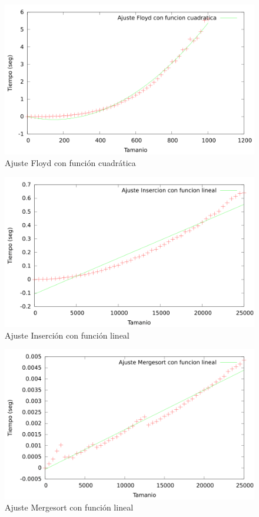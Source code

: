 \documentclass{article}
\begin{document}
	\begin{figure}[h]
		\centering
		\includegraphics[totalheight=8cm]{img/ajusteFloyd_cuadratico}
		\caption{Ajuste Floyd con función cuadrática}
		\label{fig:ajusteFloyd_cuadratico}
	\end{figure}
	
	\begin{figure}[h]
		\centering
		\includegraphics[totalheight=8cm]{img/ajusteInsercion_lineal}
		\caption{Ajuste Inserción con función lineal}
		\label{fig:ajusteInsercion_lineal}
	\end{figure}
	
	\begin{figure}[h]
		\centering
		\includegraphics[totalheight=8cm]{img/ajusteMergesort_lineal}
		\caption{Ajuste Mergesort con función lineal}
		\label{fig:ajusteMergesort_lineal}
	\end{figure}
	
\end{document}
